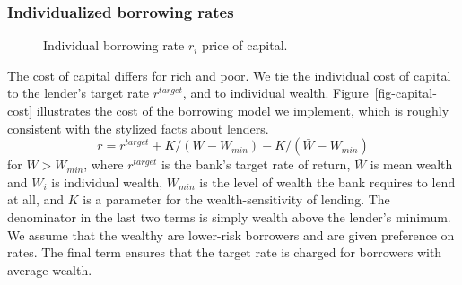 {%

\subsubsection{Individualized borrowing rates} \label{sec:borowing-rate}

    \begin{figure}
    \centering
    \label{fig-capital-cost}
    \caption[Individual borrowing rate $r_i$ price of capital]{Individual borrowing rate $r_i$ price of capital.}
    \label{fig:Wealth-based}
    \end{figure}

The cost of capital differs for rich and poor. We tie the individual cost of capital %
to the lender's target rate $r^{target}$, and to individual wealth. Figure~\ref{fig-capital-cost} illustrates the cost of the borrowing model we implement, which is roughly consistent with the stylized facts about lenders. 
\begin{equation}
{r} = r^{target}+ K/(W-W_{min}) -K/(\bar W - W_{min})\label{eqn-interest-wealth-relationship}
\end{equation}
for $W>W_{min}$, where  $r^{target}$ is the bank's target rate of return,  $\bar{W}$ is mean wealth and $W_i$ is individual wealth, $W_{min}$ is the level of wealth the bank requires to lend at all, and $K$ is a parameter for the wealth-sensitivity of lending. The denominator in the last two terms is simply wealth above the lender's minimum. We assume that the wealthy are lower-risk borrowers and are given preference on rates. The final term ensures that the target rate is charged for borrowers with average wealth.


}
